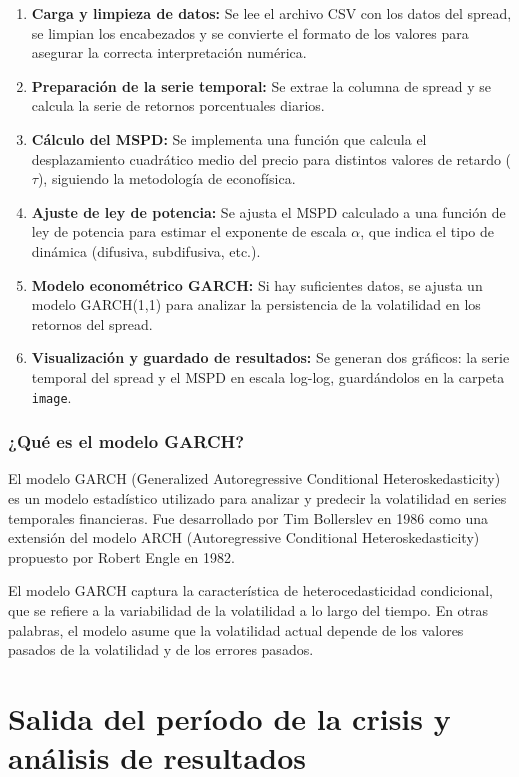 \documentclass[12pt,a4paper]{article}
\begin{document}
\begin{enumerate}
    \item \textbf{Carga y limpieza de datos:} Se lee el archivo CSV con los datos del spread, se limpian los encabezados y se convierte el formato de los valores para asegurar la correcta interpretación numérica.
    \item \textbf{Preparación de la serie temporal:} Se extrae la columna de spread y se calcula la serie de retornos porcentuales diarios.
    \item \textbf{Cálculo del MSPD:} Se implementa una función que calcula el desplazamiento cuadrático medio del precio para distintos valores de retardo ($\tau$), siguiendo la metodología de econofísica.
    \item \textbf{Ajuste de ley de potencia:} Se ajusta el MSPD calculado a una función de ley de potencia para estimar el exponente de escala $\alpha$, que indica el tipo de dinámica (difusiva, subdifusiva, etc.).
    \item \textbf{Modelo econométrico GARCH:} Si hay suficientes datos, se ajusta un modelo GARCH(1,1) para analizar la persistencia de la volatilidad en los retornos del spread.
    \item \textbf{Visualización y guardado de resultados:} Se generan dos gráficos: la serie temporal del spread y el MSPD en escala log-log, guardándolos en la carpeta \texttt{image}.
\end{enumerate}

\subsubsection{¿Qué es el modelo GARCH?}

El modelo GARCH (Generalized Autoregressive Conditional Heteroskedasticity) es un modelo estadístico utilizado para analizar y predecir la volatilidad en series temporales financieras. Fue desarrollado por Tim Bollerslev en 1986 como una extensión del modelo ARCH (Autoregressive Conditional Heteroskedasticity) propuesto por Robert Engle en 1982.

El modelo GARCH captura la característica de heterocedasticidad condicional, que se refiere a la variabilidad de la volatilidad a lo largo del tiempo. En otras palabras, el modelo asume que la volatilidad actual depende de los valores pasados de la volatilidad y de los errores pasados.

\section{Salida del período de la crisis y análisis de resultados}
\end{document}
